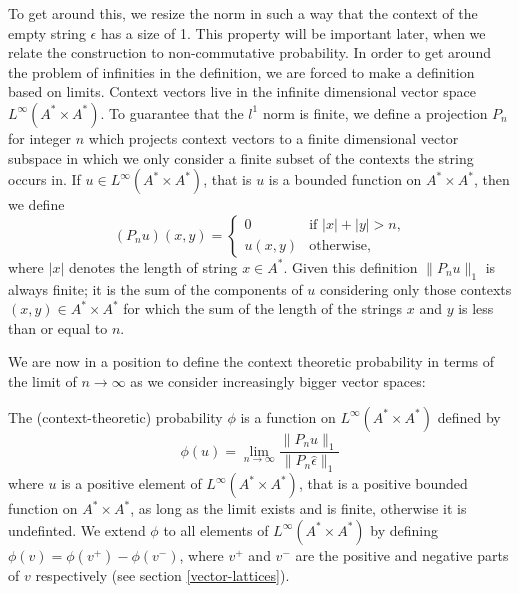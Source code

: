

To get around this, we resize the norm in such a way that the context of the empty string $\epsilon$ has a size of 1. This property will be important later, when we relate the construction to non-commutative probability. In order to get around the problem of infinities in the definition, we are forced to make a definition based on limits. Context vectors live in the infinite dimensional vector space $L^\infty(A^*\times A^*)$. To guarantee that the $l^1$ norm is finite, we define a projection $P_n$ for integer $n$ which projects context vectors to a finite dimensional vector subspace in which we only consider a finite subset of the contexts the string occurs in. If $u \in L^\infty(A^*\times A^*)$, that is $u$ is a bounded function on $A^*\times A^*$, then we define
$$(P_n u)(x,y) = \begin{cases}
	0 & \text{if $|x| + |y| > n$,}\\
	u(x,y) & \text{otherwise,}
\end{cases}$$
where $|x|$ denotes the length of string $x\in A^*$. Given this definition $\|P_n u\|_1$ is always finite; it is the sum of the components of $u$ considering only those contexts $(x,y) \in A^*\times A^*$ for which the sum of the length of the strings $x$ and $y$ is less than or equal to $n$.

We are now in a position to define the context theoretic probability in terms of the limit of $n\rightarrow \infty$ as we consider increasingly bigger vector spaces:
\begin{defn}
The (context-theoretic) probability $\phi$ is a function on $L^\infty(A^*\times A^*)$ defined by
$$\phi(u) = \lim_{n\rightarrow\infty} \frac{\|P_n u\|_1}{\|P_n\hat{\epsilon}\|_1}$$
where $u$ is a positive element of $L^\infty(A^*\times A^*)$, that is a positive bounded function on $A^*\times A^*$, as long as the limit exists and is finite, otherwise it is undefinted. We extend $\phi$ to all elements of $L^\infty(A^*\times A^*)$ by defining $\phi(v) = \phi(v^+) - \phi(v^-)$, where $v^+$ and $v^-$ are the positive and negative parts of $v$ respectively (see section \ref{vector-lattices}).
\end{defn}

